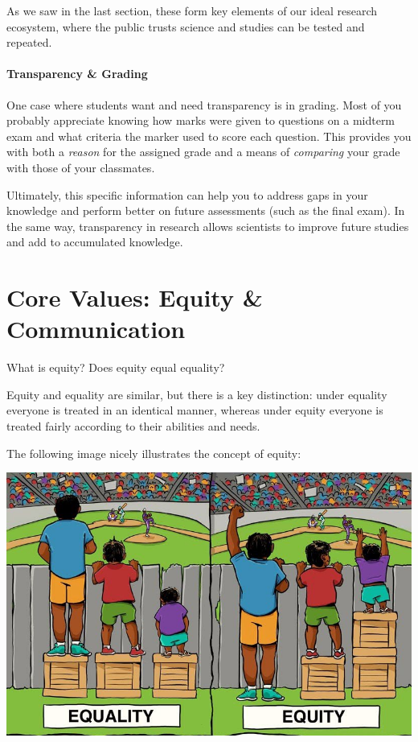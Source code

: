 \documentclass[
]{book}
\begin{document}
As we saw in the last section, these form key elements of our ideal research ecosystem, where the public trusts science and studies can be tested and repeated.

\hypertarget{transparency-grading}{%
\paragraph*{Transparency \& Grading}\label{transparency-grading}}

One case where students want and need transparency is in grading. Most of you probably appreciate knowing how marks were given to questions on a midterm exam and what criteria the marker used to score each question. This provides you with both a \emph{reason} for the assigned grade and a means of \emph{comparing} your grade with those of your classmates.

Ultimately, this specific information can help you to address gaps in your knowledge and perform better on future assessments (such as the final exam). In the same way, transparency in research allows scientists to improve future studies and add to accumulated knowledge.

\hypertarget{core-values-equity-communication}{%
\section{Core Values: Equity \& Communication}\label{core-values-equity-communication}}

What is equity? Does equity equal equality?

Equity and equality are similar, but there is a key distinction: under equality everyone is treated in an identical manner, whereas under equity everyone is treated fairly according to their abilities and needs.

The following image nicely illustrates the concept of equity:

\includegraphics{images/equity_cropped.jpg}
\end{document}
